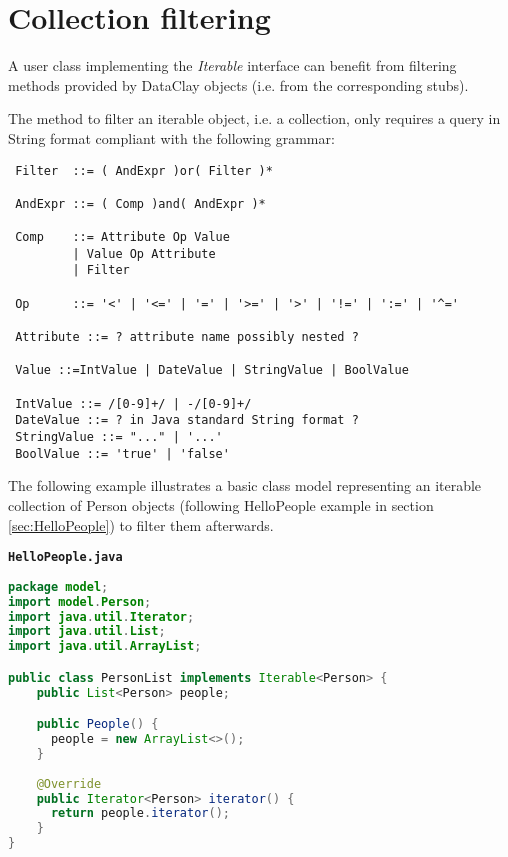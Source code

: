 \section{Collection filtering}
\label{sec:JavaFiltering}


A user class implementing the \textit{Iterable} interface can benefit from filtering methods provided by DataClay objects (i.e. from the corresponding stubs).

The method to filter an iterable object, i.e. a collection, only requires a query in String format compliant with the following grammar:

\begin{lstlisting}
 Filter  ::= ( AndExpr )or( Filter )*
 
 AndExpr ::= ( Comp )and( AndExpr )*
 
 Comp    ::= Attribute Op Value
         | Value Op Attribute
         | Filter
 
 Op      ::= '<' | '<=' | '=' | '>=' | '>' | '!=' | ':=' | '^='
 
 Attribute ::= ? attribute name possibly nested ?
 
 Value ::=IntValue | DateValue | StringValue | BoolValue

 IntValue ::= /[0-9]+/ | -/[0-9]+/
 DateValue ::= ? in Java standard String format ?
 StringValue ::= "..." | '...'
 BoolValue ::= 'true' | 'false'
\end{lstlisting}

The following example illustrates a basic class model representing an iterable collection of Person objects (following HelloPeople example in section \ref{sec:HelloPeople}) to filter them afterwards.

\begin{tBox}
\texttt{\bfseries\textcolor{basecolor}{HelloPeople.java}}
\begin{lstlisting}[language=Java]
package model;
import model.Person;
import java.util.Iterator;
import java.util.List;
import java.util.ArrayList;

public class PersonList implements Iterable<Person> {
    public List<Person> people;

    public People() {
      people = new ArrayList<>();
    }
    
    @Override
    public Iterator<Person> iterator() {
      return people.iterator();
    }
}

\end{lstlisting}
\end{tBox}

